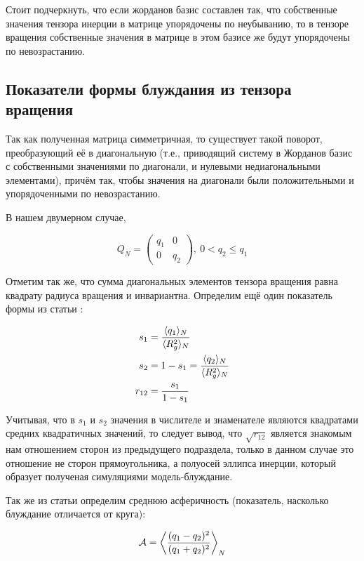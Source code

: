 Стоит подчеркнуть, что если жорданов базис составлен так, что собственные значения тензора инерции в матрице упорядочены по неубыванию, то в тензоре вращения собственные значения в матрице в этом базисе же будут упорядочены по невозрастанию.

\subsection{Показатели формы блуждания из тензора вращения}

Так как полученная матрица симметричная, то существует такой поворот, преобразующий её в диагональную (т.е., приводящий систему в Жорданов базис с собственными значениями по диагонали, и нулевыми недиагональными элементами), причём так, чтобы значения на диагонали были положительными и упорядоченными по невозрастанию.

В нашем двумерном случае, 

\begin{equation*}
    Q_{N} = \left(
    \begin{array}{cc}
      q_{1} & 0 \\
      0 & q_{2}
    \end{array} \right),\ 0 < q_{2} \leq q_{1}
\end{equation*}

Отметим так же, что сумма диагональных элементов тензора вращения равна квадрату радиуса вращения и инвариантна. Определим ещё один показатель формы из статьи \cite{caracciolo2011geometrical}:

\begin{align*}
    s_{1} &= \frac{\langle q_{1} \rangle_{N}}{\langle R_{g}^{2} \rangle_{N}}\\
    s_{2} &= 1 - s_{1} = \frac{\langle q_{2} \rangle_{N}}{\langle R_{g}^{2} \rangle_{N}}\\
    r_{12} &= \frac{s_{1}}{1-s_{1}}
\end{align*}

Учитывая, что в $s_{1}$ и $s_{2}$ значения в числителе и знаменателе являются квадратами средних квадратичных значений, то следует вывод, что $\sqrt{r_{12}}$ является знакомым нам отношением сторон из предыдущего подраздела, только в данном случае это отношение не сторон прямоугольника, а полуосей эллипса инерции, который образует полученая симуляциями модель-блуждание.

Так же из статьи \cite{caracciolo2011geometrical} определим среднюю асферичность (показатель, насколько блуждание отличается от круга):

\begin{equation}
\label{eq:Asphericity}
    \mathcal{A} = \left< \frac{(q_{1} - q_{2})^{2}}{(q_{1} + q_{2})^{2}} \right>_{N}
\end{equation}

